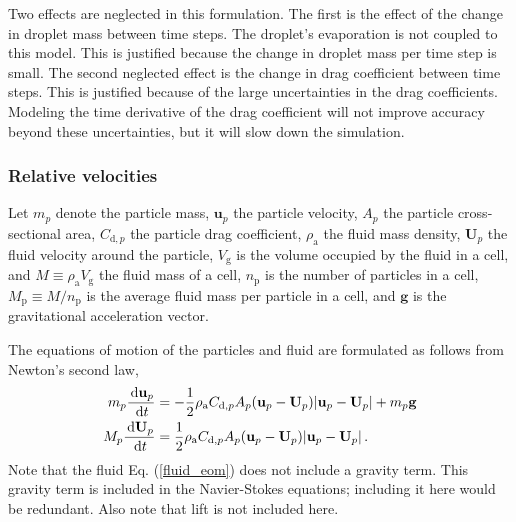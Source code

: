 Two effects are neglected in this formulation. The first is the effect of the change in droplet mass between  time steps. The droplet's evaporation is not coupled to this model. This is justified because the change in droplet mass per time step is small. The second neglected effect is the change in drag coefficient between time steps. This is justified because of the large uncertainties in the drag coefficients. Modeling the time derivative of the drag coefficient will not improve accuracy beyond these uncertainties, but it will slow down the simulation.

\subsubsection*{Relative velocities}
Let $m_p$ denote the particle mass, $\mathbf{u}_p$ the particle velocity, $A_p$ the particle cross-sectional area, $C_{\text{d},p}$ the particle drag coefficient, $\rho_\text{a}$ the fluid mass density, $\mathbf{U}_p$ the fluid velocity around the particle, $V_\text{g}$ is the volume occupied by the fluid in a cell, and $M \equiv \rho_\text{a} V_\text{g}$ the fluid mass of a cell, $n_\text{p}$ is the number of particles in a cell, $M_\text{p} \equiv M/n_\text{p}$ is the average fluid mass per particle in a cell, and $\mathbf{g}$ is the gravitational acceleration vector.

The equations of motion of the particles and fluid are formulated as follows from Newton's second law,
\begin{align}
    \label{particle_eom}
    m_p \frac{\,\mathrm{d} \mathbf{u}_p}{\,\mathrm{d} t} &= - \frac{1}{2} \rho_\text{a} C_{\text{d},p} A_p (\mathbf{u}_p - \mathbf{U}_p) |\mathbf{u}_p - \mathbf{U}_p| + m_p \mathbf{g} \\
    \label{fluid_eom}
    M_p \frac{\,\mathrm{d} \mathbf{U}_p}{\,\mathrm{d} t} &= \frac{1}{2} \rho_\text{a} C_{\text{d},p} A_p (\mathbf{u}_p - \mathbf{U}_p) |\mathbf{u}_p - \mathbf{U}_p| \,.
\end{align}
Note that the fluid Eq. (\ref{fluid_eom}) does not include a gravity term. This gravity term is included in the Navier-Stokes equations; including it here would be redundant. Also note that lift is not included here.

